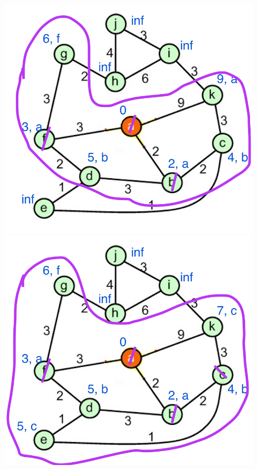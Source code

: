 \documentclass[a4paper]{exam}
\begin{document}
\begin{questions}
\begin{parts}
\begin{solution}
    \includegraphics[scale=0.2]{Q3/images3g/3g5}\\
    \includegraphics[scale=0.2]{Q3/images3g/3g6}

\end{solution}
\end{parts}
\end{questions}
\end{document}
